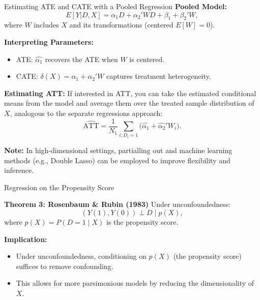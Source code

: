 \documentclass[xcolor=svgnames,t]{beamer}
\begin{document}
    
    \begin{frame}{Estimating ATE and CATE with a Pooled Regression}
    \textbf{Pooled Model:}
    \[
    E[Y|D,X] = \alpha_1 D + \alpha_2'W D + \beta_1 + \beta_2'W,
    \]
    where $W$ includes $X$ and its transformations (centered $E[W]=0$).
    
    \pause
    
    \textbf{Interpreting Parameters:}
    \begin{itemize}
        \item ATE: $\widehat{\alpha_1}$ recovers the ATE when $W$ is centered.
        \item CATE: $\delta(X) = \alpha_1 + \alpha_2'W$ captures treatment heterogeneity.
    \end{itemize}
    
    \pause
    
    \textbf{Estimating ATT:}
    If interested in ATT, you can take the estimated conditional means from the model and average them over the treated sample distribution of $X$, analogous to the separate regressions approach:
    \[
    \widehat{\text{ATT}} = \frac{1}{N_1}\sum_{i:D_i=1} \bigl(\widehat{\alpha_1} + \widehat{\alpha_2}'W_i\bigr).
    \]
    
    \pause
    
    \textbf{Note:} In high-dimensional settings, partialling out and machine learning methods (e.g., Double Lasso) can be employed to improve flexibility and inference.
    \end{frame}
    
    \begin{frame}{Regression on the Propensity Score}
        \begin{block}{\textbf{Theorem 3: Rosenbaum \& Rubin (1983)}}
        Under unconfoundedness: 
            \[
        (Y(1), Y(0)) \perp D \mid p(X),
        \]
        where $p(X) = P(D=1 \mid X)$ is the propensity score.
        \end{block}
        \pause
        \textbf{Implication:} 
        \begin{itemize}
            \item Under unconfoundedness, conditioning on $p(X)$ (the propensity score) suffices to remove confounding.
            \item This allows for more parsimonious models by reducing the dimensionality of $X$.
        \end{itemize}
        
        \pause
        
       
    \end{frame}
        
\end{document}
